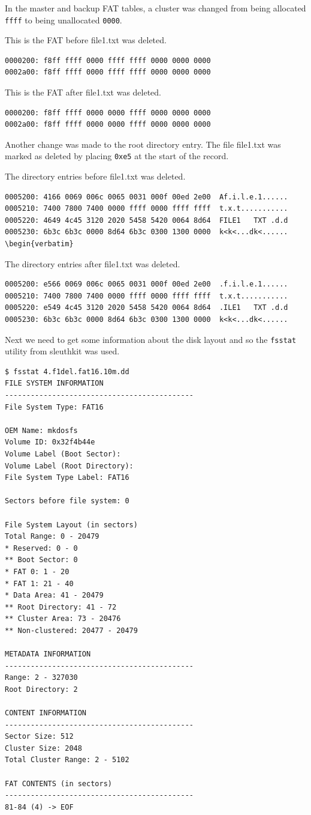 \documentclass[a4paper,
    11pt,
    normalheadings,
    parindent,
    UKenglish,
    abstracton,
    ]{scrartcl}
\begin{document}
In the master and backup FAT tables, a cluster was changed from being allocated \texttt{ffff} to being unallocated \texttt{0000}.

This is the FAT before file1.txt was deleted.
\begin{verbatim}
0000200: f8ff ffff 0000 ffff ffff 0000 0000 0000
0002a00: f8ff ffff 0000 ffff ffff 0000 0000 0000
\end{verbatim}

This is the FAT after file1.txt was deleted.
\begin{verbatim}
0000200: f8ff ffff 0000 0000 ffff 0000 0000 0000
0002a00: f8ff ffff 0000 0000 ffff 0000 0000 0000
\end{verbatim}

Another change was made to the root directory entry. The file file1.txt was marked as deleted by placing \texttt{0xe5} at the start of the record.

The directory entries before file1.txt was deleted.
\begin{verbatim}
0005200: 4166 0069 006c 0065 0031 000f 00ed 2e00  Af.i.l.e.1......
0005210: 7400 7800 7400 0000 ffff 0000 ffff ffff  t.x.t...........
0005220: 4649 4c45 3120 2020 5458 5420 0064 8d64  FILE1   TXT .d.d
0005230: 6b3c 6b3c 0000 8d64 6b3c 0300 1300 0000  k<k<...dk<......
\begin{verbatim}
\end{verbatim}

The directory entries after file1.txt was deleted.
\begin{verbatim}
0005200: e566 0069 006c 0065 0031 000f 00ed 2e00  .f.i.l.e.1......
0005210: 7400 7800 7400 0000 ffff 0000 ffff ffff  t.x.t...........
0005220: e549 4c45 3120 2020 5458 5420 0064 8d64  .ILE1   TXT .d.d
0005230: 6b3c 6b3c 0000 8d64 6b3c 0300 1300 0000  k<k<...dk<......
\end{verbatim}

Next we need to get some information about the disk layout and so the \texttt{fsstat} utility from sleuthkit was used.
\begin{verbatim}
$ fsstat 4.f1del.fat16.10m.dd
FILE SYSTEM INFORMATION
--------------------------------------------
File System Type: FAT16

OEM Name: mkdosfs
Volume ID: 0x32f4b44e
Volume Label (Boot Sector):
Volume Label (Root Directory):
File System Type Label: FAT16

Sectors before file system: 0

File System Layout (in sectors)
Total Range: 0 - 20479
* Reserved: 0 - 0
** Boot Sector: 0
* FAT 0: 1 - 20
* FAT 1: 21 - 40
* Data Area: 41 - 20479
** Root Directory: 41 - 72
** Cluster Area: 73 - 20476
** Non-clustered: 20477 - 20479

METADATA INFORMATION
--------------------------------------------
Range: 2 - 327030
Root Directory: 2

CONTENT INFORMATION
--------------------------------------------
Sector Size: 512
Cluster Size: 2048
Total Cluster Range: 2 - 5102

FAT CONTENTS (in sectors)
--------------------------------------------
81-84 (4) -> EOF
\end{verbatim}
\end{document}
